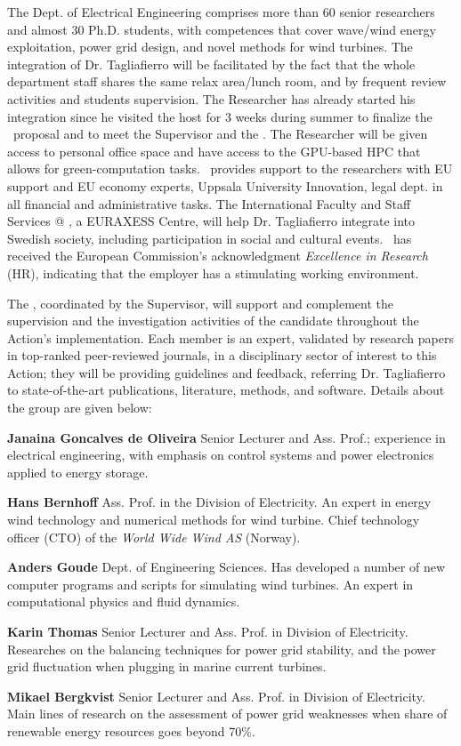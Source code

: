 The Dept. of Electrical Engineering comprises more than 60 senior researchers and almost 30 Ph.D. students, with competences that cover wave/wind energy exploitation, power grid design, and novel methods for wind turbines. The integration of Dr. Tagliafierro will be facilitated by the fact that the whole department staff shares the same relax area/lunch room, and by frequent review activities and students supervision. The Researcher has already started his integration since he visited the host for 3 weeks during summer to finalize the \nameAction\ proposal and to meet the Supervisor and the \Gop. The Researcher will be given access to personal office space and have access to the GPU-based HPC that allows for green-computation tasks. \UU\ provides support to the researchers with EU support and EU economy experts, Uppsala University Innovation, legal dept. in all financial and administrative tasks. The International Faculty and Staff Services @ \UU, a EURAXESS Centre, will help Dr. Tagliafierro integrate into Swedish society, including participation in social and cultural events. \UU\ has received the European Commission's acknowledgment \textit{Excellence in Research} (HR), indicating that the employer has a stimulating working environment.%

The \Gop, coordinated by the Supervisor, will support and complement the supervision and the investigation activities of the candidate throughout the Action's implementation. Each member is an expert, validated by research papers in top-ranked peer-reviewed journals, in a disciplinary sector of interest to this Action; they will be providing guidelines and feedback, referring Dr. Tagliafierro to state-of-the-art publications, literature, methods, and software. Details about the group are given below:
\begin{description}[font=$\bullet$\scshape\bfseries, leftmargin=2pt,noitemsep,topsep=1pt,]
    \item[]\textbf{Janaina Goncalves de Oliveira} Senior Lecturer and Ass. Prof.; experience in electrical engineering, with emphasis on control systems and power electronics applied to energy storage.
    \item[]\textbf{Hans Bernhoff} Ass. Prof. in the Division of Electricity. An expert in energy wind technology and numerical methods for wind turbine. Chief technology officer (CTO) of the \textit{World Wide Wind AS} (Norway).
    \item[]\textbf{Anders Goude} Dept. of Engineering Sciences. Has developed a number of new computer programs and scripts for simulating wind turbines. An expert in computational physics and fluid dynamics.
    \item[]\textbf{Karin Thomas} Senior Lecturer and Ass. Prof. in Division of Electricity. Researches on the balancing techniques for power grid stability, and the power grid fluctuation when plugging in marine current turbines. 
    \item[]\textbf{Mikael Bergkvist} Senior Lecturer and Ass. Prof. in Division of Electricity. Main lines of research on the assessment of power grid weaknesses when share of renewable energy resources goes beyond 70\%.
\end{description}

